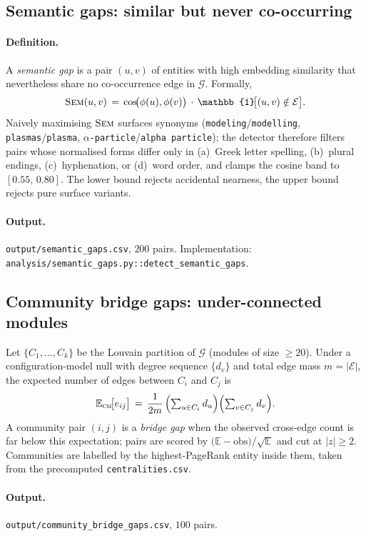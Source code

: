 \documentclass[11pt,a4paper]{article}
\newcommand{\KG}{\mathcal{G}}
\newcommand{\Entset}{\mathcal{E}}
\newcommand{\code}[1]{\texttt{\small #1}}
\begin{document}
\subsection{Semantic gaps: similar but never co-occurring}
\label{sec:semgap}
\paragraph{Definition.} A \emph{semantic gap} is a pair $(u,v)$ of entities with high embedding similarity that nevertheless share no co-occurrence edge in $\KG$. Formally,
\[
\textsc{Sem}(u,v) \,=\, \cos\!\bigl(\phi(u),\phi(v)\bigr)\,\cdot\,\mathbb{1}\!\bigl[(u,v)\notin\Entset\bigr].
\]
Naively maximising $\textsc{Sem}$ surfaces synonyms (\code{modeling}/\code{modelling}, \code{plasmas}/\code{plasma}, \code{$\alpha$-particle}/\code{alpha particle}); the detector therefore filters pairs whose normalised forms differ only in (a)~Greek letter spelling, (b)~plural endings, (c)~hyphenation, or (d)~word order, and clamps the cosine band to $[0.55,\,0.80]$. The lower bound rejects accidental nearness, the upper bound rejects pure surface variants.

\paragraph{Output.} \code{output/semantic\_gaps.csv}, $200$ pairs. Implementation: \code{analysis/semantic\_gaps.py::detect\_semantic\_gaps}.

\subsection{Community bridge gaps: under-connected modules}
Let $\{C_1,\dots,C_k\}$ be the Louvain partition of $\KG$ (modules of size $\geq 20$). Under a configuration-model null with degree sequence $\{d_v\}$ and total edge mass $m=|\Entset|$, the expected number of edges between $C_i$ and $C_j$ is
\[
\mathbb{E}_{\textsc{cm}}\!\bigl[e_{ij}\bigr] \,=\, \frac{1}{2m}\,\Bigl(\textstyle\sum_{u\in C_i} d_u\Bigr)\Bigl(\textstyle\sum_{v\in C_j} d_v\Bigr).
\]
A community pair $(i,j)$ is a \emph{bridge gap} when the observed cross-edge count is far below this expectation; pairs are scored by $\bigl(\mathbb{E}-\text{obs}\bigr)/\sqrt{\mathbb{E}}$ and cut at $|z|\geq 2$. Communities are labelled by the highest-PageRank entity inside them, taken from the precomputed \code{centralities.csv}.

\paragraph{Output.} \code{output/community\_bridge\_gaps.csv}, $100$ pairs.
\end{document}
